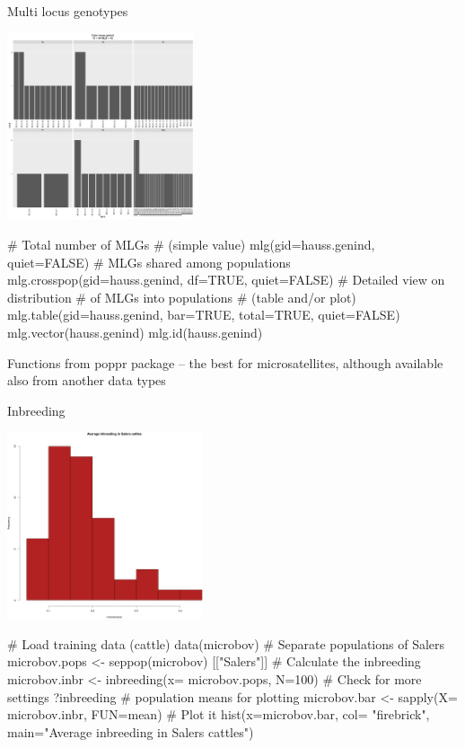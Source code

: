 \documentclass[compress, ucs, xelatex, 11pt, xcolor=svgnames,
  hyperref={
    bookmarks=true,
    unicode=true,
    colorlinks=true,
    pdftitle={Molecular data in R},
    plainpages=false,
    pdfauthor={Vojtech Zeisek},
    pdfsubject={Course about phylogeny and evolution in R},
    pdfcreator={XeLaTeX},
    pdfkeywords={R, evolution, phylogeny, molecular data},
    linkcolor=Tomato,
    anchorcolor=SaddleBrown,
    citecolor=Goldenrod,
    filecolor=DarkMagenta,
    menucolor=Sienna,
    urlcolor=DarkTurquoise,
    pdftex},
  url={hyphens, lowtilde} %
  ]{beamer}
\begin{document}
\begin{frame}[fragile]{Multi locus genotypes}
  \begin{multicols}{2}
  \includegraphics[height=5.5cm]{mlg.png}
  \begin{spluscode}
    # Total number of MLGs
    # (simple value)
    mlg(gid=hauss.genind, quiet=FALSE)
    # MLGs shared among populations
    mlg.crosspop(gid=hauss.genind,
      df=TRUE, quiet=FALSE)
    # Detailed view on distribution
    # of MLGs into populations
    # (table and/or plot)
    mlg.table(gid=hauss.genind,
      bar=TRUE, total=TRUE,
      quiet=FALSE)
    mlg.vector(hauss.genind)
    mlg.id(hauss.genind)
  \end{spluscode}
  \end{multicols}
  Functions from poppr package -- the best for microsatellites, although available also from another data types
\end{frame}

\begin{frame}[fragile]{Inbreeding}
\begin{multicols}{2}
  \includegraphics[height=5.5cm]{inbreeding.png}
  \begin{spluscode}
    # Load training data (cattle)
    data(microbov)
    # Separate populations of Salers
    microbov.pops <- seppop(microbov)
      [["Salers"]]
    # Calculate the inbreeding
    microbov.inbr <- inbreeding(x=
      microbov.pops, N=100)
    # Check for more settings
    ?inbreeding
    # population means for plotting
    microbov.bar <- sapply(X=
      microbov.inbr, FUN=mean)
    # Plot it
    hist(x=microbov.bar, col=
      "firebrick", main="Average
      inbreeding in Salers cattles")
  \end{spluscode}
\end{multicols}

\end{frame}
\end{document}
